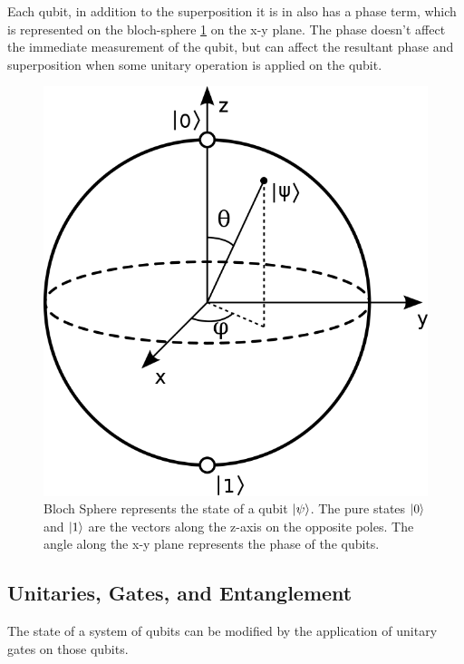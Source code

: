 Each qubit, in addition to the superposition it is in also has a phase term, which is represented on the bloch-sphere \ref{fig:bloch-sphere} on the x-y plane. The phase doesn't affect the immediate measurement of the qubit, but can affect the resultant phase and superposition when some unitary operation is applied on the qubit.

\begin{figure}[H]
    \centering
    \includegraphics[width=0.5\linewidth]{figures/quantum/bloch_sphere.png}
    \caption{Bloch Sphere represents the state of a qubit $\ket{\psi}$. The pure states $\ket{0}$ and $\ket{1}$ are the vectors along the z-axis on the opposite poles. The angle along the x-y plane represents the phase of the qubits.}
    \label{fig:bloch-sphere}
\end{figure}


\subsection{Unitaries, Gates, and Entanglement}

The state of a system of qubits can be modified by the application of unitary gates on those qubits.

